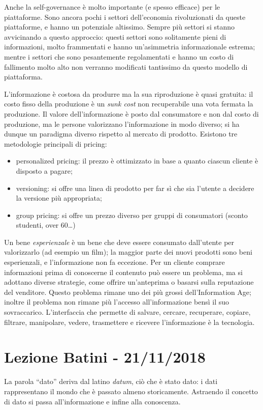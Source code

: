 \documentclass[a4page, 11pt]{article}
\begin{document}
Anche la self-governance è molto importante (e spesso efficace) per le piattaforme.
Sono ancora pochi i settori dell'economia rivoluzionati da queste piattaforme, e hanno un potenziale altissimo.
Sempre più settori si stanno avvicinando a questo approccio: questi settori sono solitamente pieni di informazioni, molto frammentati e hanno un'asimmetria informazionale estrema; mentre i settori che sono pesantemente regolamentati e hanno un costo di fallimento molto alto non verranno modificati tantissimo da questo modello di piattaforma.

L'informazione è costosa da produrre ma la sua riproduzione è quasi gratuita: il costo fisso della produzione è un \textit{sunk cost} non recuperabile una vota fermata la produzione.
Il valore dell'informazione è posto dal consumatore e non dal costo di produzione, ma le persone valorizzano l'informazione in modo diverso; si ha dunque un paradigma diverso rispetto al mercato di prodotto.
Esistono tre metodologie principali di pricing:
\begin{itemize}
\item personalized pricing: il prezzo è ottimizzato in base a quanto ciascun cliente è disposto a pagare;
\item versioning: si offre una linea di prodotto per far sì che sia l'utente a decidere la versione più appropriata;
\item group pricing: si offre un prezzo diverso per gruppi di consumatori (sconto studenti, over 60\ldots)
\end{itemize}

Un bene \textit{esperienzale} è un bene che deve essere consumato dall'utente per valorizzarlo (ad esempio un film); la maggior parte dei nuovi prodotti sono beni esperienzali, e l'informazione non fa eccezione.
Per un cliente comprare informazioni prima di conoscerne il contenuto può essere un problema, ma si adottano diverse strategie, come offrire un'anteprima o basarsi sulla reputazione del venditore.
Questo problema rimane uno dei più grossi dell'Information Age; inoltre il problema non rimane più l'accesso all'informazione bensì il suo sovraccarico.
L'interfaccia che permette di salvare, cercare, recuperare, copiare, filtrare, manipolare, vedere, trasmettere e ricevere l'informazione è la tecnologia.

\section*{Lezione Batini - 21/11/2018}
La parola ``dato'' deriva dal latino \textit{datum}, ciò che è stato dato: i dati rappresentano il mondo che è passato almeno storicamente.
Astraendo il concetto di dato si passa all'informazione e infine alla conoscenza.
\end{document}

